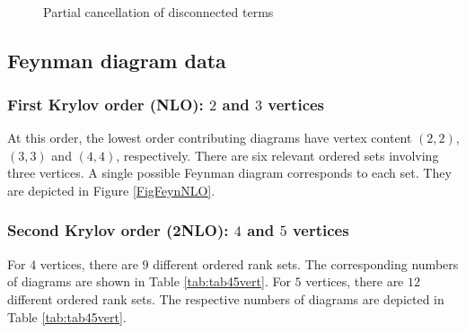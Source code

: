 \documentclass[twocolumn,secnumarabic,amssymb, nobibnotes, aps, prd]{revtex4-2}
\begin{document}
\begin{figure}
\centering
{}\\
\caption{Partial cancellation of disconnected terms}
\label{FigIntervals}
\end{figure}

\subsection{Feynman diagram data}
\subsubsection{First Krylov order (NLO): $2$ and $3$ vertices}
At this order, the lowest order contributing diagrams have vertex
content $(2,2)$, $(3,3)$ and $(4,4)$, respectively.
There are six relevant ordered sets involving three vertices.
A single possible Feynman diagram corresponds to each set. They
are depicted in Figure \ref{FigFeynNLO}.

\subsubsection{Second Krylov order (2NLO): $4$ and $5$ vertices}
For $4$ vertices, there are $9$ different ordered rank sets.
The corresponding numbers of diagrams are shown in Table \ref{tab:tab45vert}.
For $5$ vertices, there are $12$ different ordered rank sets. The respective numbers of diagrams are depicted in Table \ref{tab:tab45vert}.
\end{document}
